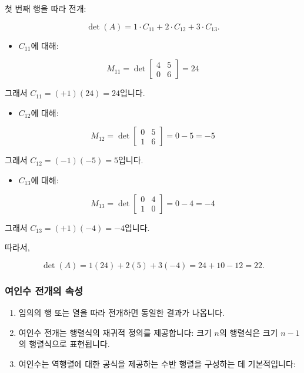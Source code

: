 \documentclass[
  12pt,
  a4paper,
]{article}
\begin{document}
첫 번째 행을 따라 전개:

\[\det(A) = 1 \cdot C_{11} + 2 \cdot C_{12} + 3 \cdot C_{13}.\]

\begin{itemize}
\item
  \(C_{11}\)에 대해:
\end{itemize}

\[M_{11} = \det \begin{bmatrix} 4 & 5 \\ 0 & 6 \end{bmatrix} = 24\]

그래서 \(C_{11} = (+1)(24) = 24\)입니다.

\begin{itemize}
\item
  \(C_{12}\)에 대해:
\end{itemize}

\[M_{12} = \det \begin{bmatrix} 0 & 5 \\ 1 & 6 \end{bmatrix} = 0 - 5 = -5\]

그래서 \(C_{12} = (-1)(-5) = 5\)입니다.

\begin{itemize}
\item
  \(C_{13}\)에 대해:
\end{itemize}

\[M_{13} = \det \begin{bmatrix} 0 & 4 \\ 1 & 0 \end{bmatrix} = 0 - 4 = -4\]

그래서 \(C_{13} = (+1)(-4) = -4\)입니다.

따라서,

\[\det(A) = 1(24) + 2(5) + 3(-4) = 24 + 10 - 12 = 22.\]

\subsubsection{여인수 전개의 속성}\label{properties-of-cofactor-expansion}

\begin{enumerate}
\def\labelenumi{\arabic{enumi}.}
\item
  임의의 행 또는 열을 따라 전개하면 동일한 결과가 나옵니다.
\item
  여인수 전개는 행렬식의 재귀적 정의를 제공합니다: 크기 \(n\)의 행렬식은 크기 \(n-1\)의 행렬식으로 표현됩니다.
\item
  여인수는 역행렬에 대한 공식을 제공하는 수반 행렬을 구성하는 데 기본적입니다:
\end{enumerate}
\end{document}
